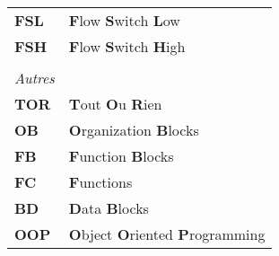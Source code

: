 \begin{tabular}{ll}
	\textbf{FSL} & \textbf{F}low \textbf{S}witch  \textbf{L}ow \\
	\textbf{FSH} & \textbf{F}low \textbf{S}witch  \textbf{H}igh \\
	
	&\\
	{\large \textbullet \emph{ 	Autres}} &\\
	\textbf{TOR} & \textbf{T}out \textbf{O}u \textbf{R}ien\\
	\textbf{OB} & \textbf{O}rganization \textbf{B}locks\\
	\textbf{FB} & \textbf{F}unction \textbf{B}locks\\
	\textbf{FC} & \textbf{F}unctions \\
	\textbf{BD} & \textbf{D}ata \textbf{B}locks\\
	
	\textbf{OOP} & \textbf{O}bject \textbf{O}riented \textbf{P}rogramming
	
	
\end{tabular}
                   
\endgroup
